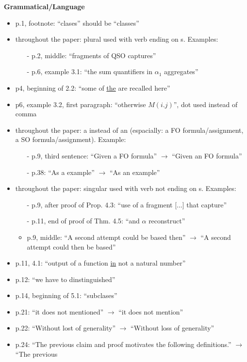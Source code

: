 \vspace{1em}
{\bf Grammatical/Language}
\begin{itemize}
	\setlength\itemsep{0.5em}
	\item p.1, footnote: ``clases'' should be ``classes''
	\item throughout the paper: plural used with verb ending on s. Examples:
	\begin{itemize}
	\item[-] p.2, middle: ``fragments of QSO captures''
	\item[-] p.6, example 3.1: ``the sum quantifiers in $\alpha_1$ aggregates''
	\end{itemize}
	\item p4, beginning of 2.2: ``some of \underline{the} are recalled here''
	\item p6, example 3.2, first paragraph: ``otherwise $M(i.j)$'', dot used instead of comma
	\item throughout the paper: a instead of an (espacially: a FO formula/assignment, a SO formula/assignment).
	Example:
	\begin{itemize}
		\item[-] p.9, third sentence: ``Given a FO formula'' $\to$ ``Given an FO formula''
	\item[-] p.38: ``As a example'' $\to$ ``As an example''
\end{itemize}
	\item throughout the paper: singular used with verb not ending on s. Examples:
	\begin{itemize}
	\item[-] p.9, after proof of Prop. 4.3: ``use of a fragment [...] that capture''
	\item[-] p.11, end of proof of Thm. 4.5: ``and $\alpha$ reconstruct''
	\item p.9, middle: ``A second attempt could be based then'' $\to$ ``A second attempt could then be
	based''
\end{itemize}
	\item p.11, 4.1: ``output of a function \underline{in} not a natural number''
	\item p.12: ``we have to dinstinguished''
	\item p.14, beginning of 5.1: ``subclases''
	\item p.21: ``it does not mentioned'' $\to$ ``it does not mention''
	\item p.22: ``Without lost of generality'' $\to$ ``Without loss of generality''
	\item p.24: ``The previous claim and proof motivates the following definitions.'' $\to$ ``The previous

\end{itemize}
